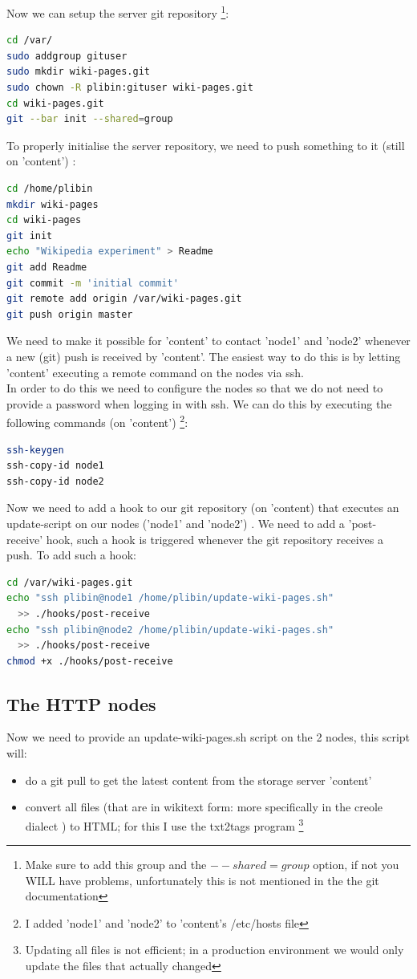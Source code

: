 \documentclass[12pt]{report}
\begin{document}
Now we can setup the server git repository \cite{git_setup_server}
\footnote{Make sure to add this group and the $--shared=group$ option,
if not you WILL have problems, unfortunately this is not mentioned in
the the git documentation}: 
\begin{lstlisting}[language=bash]
cd /var/
sudo addgroup gituser
sudo mkdir wiki-pages.git
sudo chown -R plibin:gituser wiki-pages.git
cd wiki-pages.git
git --bar init --shared=group
\end{lstlisting}
To properly initialise the server repository, we need to push
something to it (still on 'content') \cite{git_setup_server}:
\begin{lstlisting}[language=bash]
cd /home/plibin
mkdir wiki-pages
cd wiki-pages
git init
echo "Wikipedia experiment" > Readme
git add Readme
git commit -m 'initial commit'
git remote add origin /var/wiki-pages.git
git push origin master
\end{lstlisting}

We need to make it possible for  'content' to contact 'node1' and
'node2' whenever a new (git) push is received by 'content'. The
easiest way to do this is by letting 'content' executing a remote command on
the nodes via ssh.\\
In order to do this we need to configure the nodes so that we do not
need to provide a password when logging in with ssh. 
We can do this by executing the following commands (on 'content')
\footnote{I added 'node1' and 'node2' to 'content's /etc/hosts file}:
\begin{lstlisting}[language=bash]
ssh-keygen
ssh-copy-id node1
ssh-copy-id node2
\end{lstlisting}

Now we need to add a hook to our git repository (on 'content) that
executes an update-script on our nodes ('node1' and 'node2')
\cite{git_hooks}.
We need to add a 'post-receive' hook, such a hook is triggered
whenever the git repository receives a push.
To add such a hook:
\begin{lstlisting}[language=bash]
cd /var/wiki-pages.git
echo "ssh plibin@node1 /home/plibin/update-wiki-pages.sh" 
  >> ./hooks/post-receive
echo "ssh plibin@node2 /home/plibin/update-wiki-pages.sh" 
  >> ./hooks/post-receive
chmod +x ./hooks/post-receive
\end{lstlisting}

\subsection{The HTTP nodes}
Now we need to provide an update-wiki-pages.sh script on the 2 nodes,
this script will:
\begin{itemize}
\item do a git pull to get the latest content from the storage server
'content'
\item convert all files (that are in wikitext form: more specifically
  in the creole dialect \cite{creole_dialect}) to HTML; for this I use
  the txt2tags program \footnote{Updating all files is not efficient;
    in a production environment we would only update  the files that actually changed}
\end{itemize}
\end{document}
